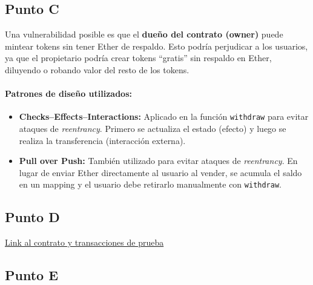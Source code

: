 \documentclass[12pt]{article}
\begin{document}
\subsection{Punto C}

Una vulnerabilidad posible es que el \textbf{dueño del contrato (owner)} puede mintear tokens sin tener Ether de respaldo.  
Esto podría perjudicar a los usuarios, ya que el propietario podría crear tokens “gratis” sin respaldo en Ether, diluyendo o robando valor del resto de los tokens.

\paragraph{Patrones de diseño utilizados:}

\begin{itemize}
\item \textbf{Checks–Effects–Interactions:}  
Aplicado en la función \texttt{withdraw} para evitar ataques de \emph{reentrancy}.  
Primero se actualiza el estado (efecto) y luego se realiza la transferencia (interacción externa).

\item \textbf{Pull over Push:}  
También utilizado para evitar ataques de \emph{reentrancy}.  
En lugar de enviar Ether directamente al usuario al vender, se acumula el saldo en un mapping y el usuario debe retirarlo manualmente con \texttt{withdraw}.
\end{itemize}

\subsection{Punto D}

\href{https://sepolia.etherscan.io/address/0x9e9ecf0f439e3e9baf78346f78e99428c19d9984}{Link al contrato y transacciones de prueba}

\subsection{Punto E}
\end{document}
